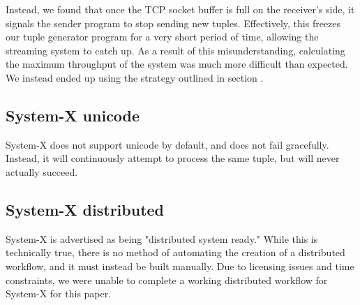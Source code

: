 Instead, we found that once the TCP socket buffer is full on the receiver's side, it signals the sender program to stop sending new tuples.  Effectively, this freezes our tuple generator program for a very short period of time, allowing the streaming system to catch up.  As a result of this misunderstanding, calculating the maximum throughput of the system was much more difficult than expected.  We instead ended up using the strategy outlined in section .

\subsection{System-X unicode}
System-X does not support unicode by default, and does not fail gracefully.  Instead, it will continuously attempt to process the same tuple, but will never actually succeed.

\subsection{System-X distributed}
\label{ssec:sysx-dist}
System-X is advertised as being "distributed system ready."  While this is technically true, there is no method of automating the creation of a distributed workflow, and it must instead be built manually.  Due to licensing issues and time constraints, we were unable to complete a working distributed workflow for System-X for this paper.
